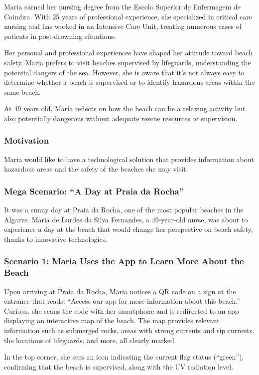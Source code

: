 Maria earned her nursing degree from the Escola Superior de Enfermagem de Coimbra. With 25 years of professional experience, she specialized in critical care nursing and has worked in an Intensive Care Unit, treating numerous cases of patients in post-drowning situations.

Her personal and professional experiences have shaped her attitude toward beach safety. Maria prefers to visit beaches supervised by lifeguards, understanding the potential dangers of the sea. However, she is aware that it’s not always easy to determine whether a beach is supervised or to identify hazardous areas within the same beach.

At 49 years old, Maria reflects on how the beach can be a relaxing activity but also potentially dangerous without adequate rescue resources or supervision.
\subsubsection{\textbf{Motivation}}
Maria would like to have a technological solution that provides information about hazardous areas and the safety of the beaches she may visit.
\subsubsection{\textbf{Mega Scenario: ``A Day at Praia da Rocha''}}
It was a sunny day at Praia da Rocha, one of the most popular beaches in the Algarve. Maria de Lurdes da Silva Fernandes, a 49-year-old nurse, was about to experience a day at the beach that would change her perspective on beach safety, thanks to innovative technologies.

\subsubsection{\textbf{Scenario 1:} Maria Uses the App to Learn More About the Beach}
Upon arriving at Praia da Rocha, Maria notices a QR code on a sign at the entrance that reads: “Access our app for more information about this beach.” Curious, she scans the code with her smartphone and is redirected to an app displaying an interactive map of the beach. The map provides relevant information such as submerged rocks, areas with strong currents and rip currents, the locations of lifeguards, and more, all clearly marked.

In the top corner, she sees an icon indicating the current flag status (“green”), confirming that the beach is supervised, along with the UV radiation level.

